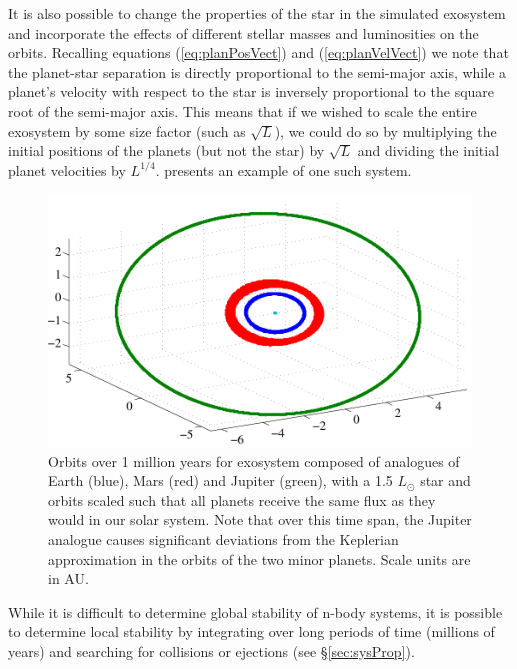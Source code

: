 It is also possible to change the properties of the star in the simulated exosystem and incorporate the effects of different stellar masses and luminosities on the orbits.  Recalling equations (\ref{eq:planPosVect}) and (\ref{eq:planVelVect}) we note that the planet-star separation is directly proportional to the semi-major axis, while a planet's velocity with respect to the star is inversely proportional to the square root of the semi-major axis.  This means that if we wished to scale the entire exosystem by some size factor (such as $\sqrt{L}$), we could do so by multiplying the initial positions of the planets (but not the star) by $\sqrt{L}$ and dividing the initial planet velocities by $L^{1/4}$.  presents an example of one such system.
\begin{figure}[ht]
 \center
 \includegraphics[width = 5.5in]{./figures/subSolSys}
  \caption[Sample Multi-body exosystem ]{ \label{fig:subSolSys} Orbits over 1 million years for exosystem composed of analogues of Earth (blue), Mars (red) and Jupiter (green), with a 1.5 $L_\odot$ star and orbits scaled such that all planets receive the same flux as they would in our solar system.  Note that over this time span, the Jupiter analogue causes significant deviations from the Keplerian approximation in the orbits of the two minor planets.  Scale units are in AU.}
\end{figure} 
While it is difficult to determine global stability of n-body systems, it is possible to determine local stability by integrating over long periods of time (millions of years) and searching for collisions or ejections (see \S\ref{sec:sysProp}).

